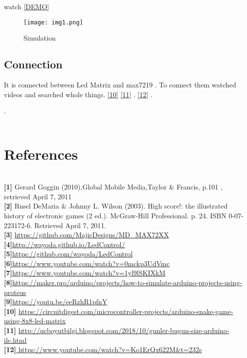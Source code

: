 \documentclass[onecolumn]{article}
\begin{document}
watch \href{https://www.youtube.com/watch?v=kvo1VcnqueU}{{[DEMO]}} 

\begin{figure}[ht!]
\centering
\texttt{[image: img1.png]}
\caption{Simulation \label{}}
\end{figure}

\subsection{Connection}

 It is connected between Led Matrix and max7219 . To connect them watched videos and searched whole things. \href{https://www.youtube.com/watch?v=ogA4ilIMhi0&t=245s}{ {[10]}} \href{https://www.youtube.com/watch?v=TjqxFGr6U4M}{ {[11]}}  . \href{https://www.youtube.com/watch?v=Ko1ErQx622M&t=232s}{ {[12]}}  . 


.\\\\
\section{References }
\\
\textbf{[1]}  Gerard Goggin (2010),Global Mobile Media,Taylor & Francis, p.101 , retrieved April 7, 2011 
\\
\textbf{[2]}   Rusel DeMaria & Johnny L. Wilson (2003). High score!: the illustrated history of electronic games (2 ed.). McGraw-Hill Professional. p. 24. ISBN 0-07-223172-6. Retrieved April 7, 2011.
\\
 \textbf{[3]} \url{https://github.com/MajicDesigns/MD_MAX72XX}
\\
\textbf{[4]}\url{http://wayoda.github.io/LedControl/}
\\
\textbf{[5]}\url{https://github.com/wayoda/LedControl}
\\
\textbf{[6]}\url{https://www.youtube.com/watch?v=0mckp3UdVmc}
\\
\textbf{[7]}\url{https://www.youtube.com/watch?v=1yl9lSKIXkM}
\\
\textbf{[8]}\url{https://maker.pro/arduino/projects/how-to-simulate-arduino-projects-using-proteus}
\\
\textbf{[9]}\url{https://youtu.be/eeRzhR1pfnY}
\\
\textbf{[10]}
\url{https://circuitdigest.com/microcontroller-projects/arduino-snake-game-using-8x8-led-matrix}
\\
\textbf{[11]}
\url{http://ucboyutbilgi.blogspot.com/2018/10/gunler-bugun-size-arduino-ile.html}
\\
\textbf{[12]}\url{
https://www.youtube.com/watch?v=Ko1ErQx622M&t=232s}
\\
\end{document}
